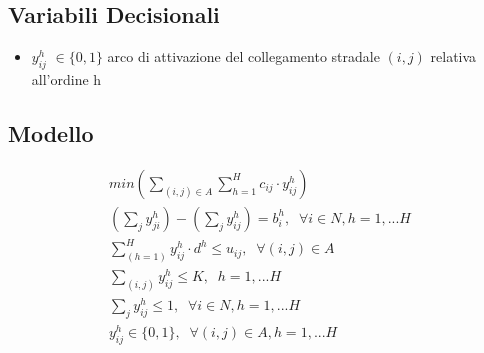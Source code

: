 \documentclass{article}
\begin{document}

\subsection{Variabili Decisionali}
\begin{itemize}
    \item $y_{ij}^h$ $\in \{0,1\}$ arco di attivazione del collegamento stradale $(i,j)$ relativa all'ordine h
\end{itemize}

\subsection{Modello}

\label{problem1}
\begin{align}
    min (\sum_{(i,j) \in A}\sum_{h=1}^H c_{ij} \cdot y_{ij}^h)
    \label{mod:obj}
    \\
    (\sum_{j}y_{ji}^h)- (\sum_{j}y_{ij}^h ) = b_i^h, \; \; \forall i \in N, h=1, ... H
    \label{mod:v2}
    \\
    \sum_{(h=1)}^H y_{ij}^h \cdot d^h \leq u_{ij}, \; \; \forall (i,j) \in A
    \label{mod:v3}
    \\
    \sum_{(i,j)} y_{ij}^h  \leq K, \; \; h=1, ... H
    \label{mod:v4}
    \\
    \sum_{j} y_{ij}^h \leq 1, \; \; \forall i \in \textit{N} , h=1, ... H
    \label{mod:v5}
    \\
     y_{ij}^h \in \{0,1\}, \; \; \forall (i,j) \in A, h=1, ... H
    \label{mod:v6}
\end{align}
\end{document}
